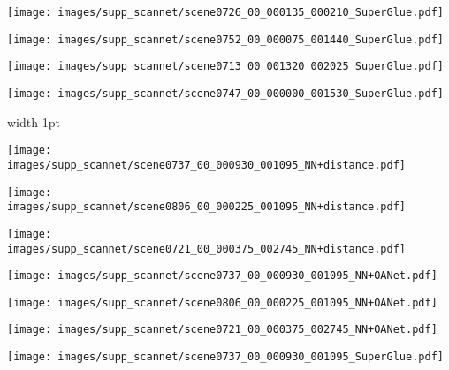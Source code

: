 \documentclass[10pt,twocolumn,letterpaper]{article}
\renewcommand{\*}[1]{\mathbf{#1}}
\newcommand{\0}{\phantom{0}}
\begin{document}
\begin{figure*}[ht!]
\begin{minipage}{\iwidth\textwidth}
    \vspace{.5mm}
    \texttt{[image: images/supp\_scannet/scene0726\_00\_000135\_000210\_SuperGlue.pdf]}
    
    \vspace{.5mm}
    \texttt{[image: images/supp\_scannet/scene0752\_00\_000075\_001440\_SuperGlue.pdf]}

    \vspace{.5mm}
    \texttt{[image: images/supp\_scannet/scene0713\_00\_001320\_002025\_SuperGlue.pdf]}
    
    \vspace{.5mm}
    \texttt{[image: images/supp\_scannet/scene0747\_00\_000000\_001530\_SuperGlue.pdf]}
\end{minipage}

\vspace{1.5mm}
\begin{minipage}{0.02\textwidth}
\end{minipage}\hfill{\vline width 1pt}\hfill
\hspace{1mm}\begin{minipage}{\iwidth\textwidth}
    \texttt{[image: images/supp\_scannet/scene0737\_00\_000930\_001095\_NN+distance.pdf]}
    
    \vspace{.5mm}
    \texttt{[image: images/supp\_scannet/scene0806\_00\_000225\_001095\_NN+distance.pdf]}
    
    \vspace{.5mm}
    \texttt{[image: images/supp\_scannet/scene0721\_00\_000375\_002745\_NN+distance.pdf]}
\end{minipage}\hspace{1mm}\begin{minipage}{\iwidth\textwidth}
    \texttt{[image: images/supp\_scannet/scene0737\_00\_000930\_001095\_NN+OANet.pdf]}
    
    \vspace{.5mm}
    \texttt{[image: images/supp\_scannet/scene0806\_00\_000225\_001095\_NN+OANet.pdf]}
    
    \vspace{.5mm}
    \texttt{[image: images/supp\_scannet/scene0721\_00\_000375\_002745\_NN+OANet.pdf]}
\end{minipage}\hspace{1mm}\begin{minipage}{\iwidth\textwidth}
    \texttt{[image: images/supp\_scannet/scene0737\_00\_000930\_001095\_SuperGlue.pdf]}
    

\end{minipage}
\end{figure*}
\end{document}

